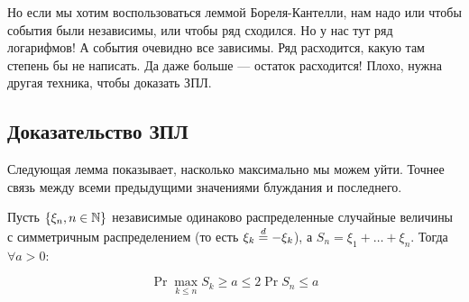 Но если мы хотим воспользоваться леммой Бореля-Кантелли, нам надо или чтобы
события были независимы, или чтобы ряд сходился. Но у нас тут ряд логарифмов! А события
очевидно все зависимы.
Ряд расходится, какую там степень бы не написать. Да даже больше --- остаток расходится!
Плохо, нужна другая техника, чтобы доказать ЗПЛ.

\subsection{Доказательство ЗПЛ}

Следующая лемма показывает, насколько максимально мы можем уйти. Точнее связь
между всеми предыдущими значениями блуждания и последнего.

\begin{theorem}
  Пусть $\{\xi_n, n \in \mathbb{N}\}$ независимые одинаково распределенные случайные
  величины с симметричным распределением (то есть $\xi_k \overset{d}{=} -\xi_k$), а
  $S_n = \xi_1 + \ldots + \xi_n$. Тогда $\forall a > 0$:

  \[
    \Pr{\max\limits_{k \leq n} S_k \geq a} \leq 2\Pr{S_n \leq a}
  \]
\end{theorem}

